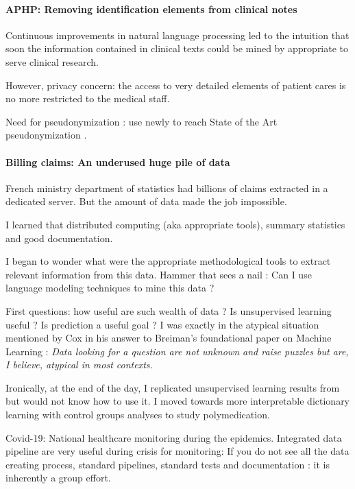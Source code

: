 \documentclass{report}
\begin{document}
\paragraph{APHP: Removing identification elements from clinical notes}

Continuous improvements in natural language processing led to the intuition that
soon the information contained in clinical texts could be mined by appropriate
to serve clinical research.

However, privacy concern: the access to very detailed elements of patient cares
is no more restricted to the medical staff.

Need for pseudonymization : use newly to reach State of the Art pseudonymization
\citep{dernoncourt2017identification, paris2019desidentification}.

\paragraph{Billing claims: An underused huge pile of data}

French ministry department of statistics had billions of claims extracted in a
dedicated server. But the amount of data made the job impossible.

I learned that distributed computing (aka appropriate tools), summary statistics
and good documentation.

I began to wonder what were the appropriate methodological tools to extract
relevant information from this data. Hammer that sees a nail : Can I use language
modeling techniques to mine this data ?

First questions: how useful are such wealth of data ? Is unsupervised learning
useful ? Is prediction a useful goal ? I was exactly in the atypical situation
mentioned by Cox in his answer to Breiman's foundational paper on Machine
Learning \citep{breiman2001statistical} : \textit{Data looking for a question are
  not unknown and raise puzzles but are, I believe, atypical in most contexts.}

Ironically, at the end of the day, I
replicated unsupervised learning results from \citep{beam2019clinical} but would
not know how to use it. I moved towards more interpretable dictionary learning
with control groups analyses to study polymedication.

Covid-19: National healthcare monitoring during the epidemics. Integrated data
pipeline are very useful during crisis for monitoring: If you do not see all the
data creating process, standard pipelines, standard tests and documentation : it
is inherently a group effort.
\end{document}
